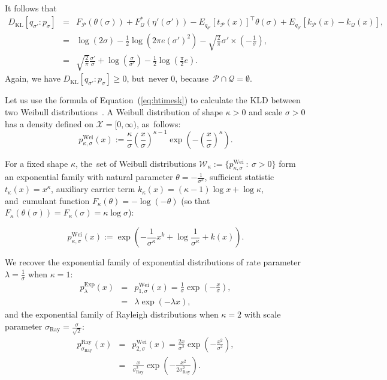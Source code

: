 \documentclass[entropy,article,accept,oneauthor,pdftex,entropy]{Definitions/mdpi}
\def\calW{\mathcal{W}}
\def\Ray{\mathrm{Ray}}
\def\Exp{\mathrm{Exp}}
\def\calQ{\mathcal{Q}}
\def\Wei{\mathrm{Wei}}
\def\KL{\mathrm{KL}}
\def\calQ{\mathcal{Q}}
\def\calP{\mathcal{P}}
\def\calX{\mathcal{X}}
\begin{document}
\begin{paracol}{2}
\begin{Example}
It follows that
\begingroup\makeatletter\def\f@size{9}\check@mathfonts
\def\maketag@@@#1{\hbox{\m@th\normalsize\normalfont#1}}%
\begin{eqnarray}
D_\KL[q_{\sigma'}:p_{\sigma}] &=& 
F_\calP(\theta(\sigma))+F_\calQ^*(\eta'(\sigma'))-E_{q_{\theta'}}[t_\calP(x)]^\top\theta(\sigma) +E_{q_{\theta'}}[k_\calP(x)-k_\calQ(x)],\\
&=& \log (2\sigma)-\frac{1}{2}\log(2\pi e(\sigma')^2)-\sqrt{\frac{2}{\pi}}\sigma'\times\left(-\frac{1}{\sigma}\right),\\
&=& \sqrt{\frac{2}{\pi}}\frac{\sigma'}{\sigma}+\log\left(\frac{\sigma}{\sigma'}\right)-\frac{1}{2}\log(\frac{\pi}{2}e).
\end{eqnarray}
\endgroup
Again, we have $D_\KL[q_{\sigma'}:p_{\sigma}]\geq 0$, but~never $0$, because~$\calP\cap\calQ=\emptyset$.
\end{Example}


\begin{Example}\label{ex:Weibull}
Let us use the formula of Equation~(\ref{eq:htimesk}) to  calculate the KLD between two Weibull distributions~\cite{KLDWeibull-2013}.
A Weibull distribution of shape $\kappa>0$ and  scale  $\sigma>0$ has a density defined on $\calX=[0,\infty)$, as~follows:
$$
p^\Wei_{\kappa,\sigma}(x) := \frac{\kappa}{\sigma} \left(\frac{x}{\sigma}\right)^{\kappa-1} 
\exp\left(-\left(\frac{x}{\sigma}\right)^\kappa\right).
$$

For a fixed shape $\kappa$, the~set of Weibull distributions $\calW_\kappa:=\{p^\Wei_{\kappa,\sigma}\ :\ \sigma>0\}$ form an exponential family with natural parameter $\theta=-\frac{1}{\sigma^\kappa}$, sufficient statistic $t_\kappa(x)=x^\kappa$, 
auxiliary carrier term $k_\kappa(x)=(\kappa-1)\log x+\log \kappa$, and~cumulant function $F_\kappa(\theta)=-\log(-\theta)$ (so that 
$F_\kappa(\theta(\sigma))=F_\kappa(\sigma)=\kappa\log\sigma$):

$$
p^\Wei_{\kappa,\sigma}(x):=\exp\left(-\frac{1}{\sigma^\kappa} x^k +\log\frac{1}{\sigma^\kappa}+k(x)\right).
$$

We recover the exponential family of exponential distributions of rate parameter $\lambda=\frac{1}{\sigma}$ when $\kappa=1$:
\begin{eqnarray*}
p^\Exp_\lambda(x)&=&p^\Wei_{1,\sigma}(x)=\frac{1}{\sigma}\exp\left(-\frac{x}{\sigma}\right),\\
&=& \lambda\exp\left(-\lambda x\right),
\end{eqnarray*}
 and the exponential family of Rayleigh distributions when $\kappa=2$ with scale parameter $\sigma_\Ray=\frac{\sigma}{\sqrt{2}}$:
\begin{eqnarray*}
p^\Ray_{\sigma_\Ray}(x)&=&p^\Wei_{2,\sigma}(x)=\frac{2x}{\sigma^2}\exp\left(-\frac{x^2}{\sigma^2}\right),\\
&=&\frac{x}{\sigma_\Ray^2}\exp\left(-\frac{x^2}{2\sigma_\Ray^2}\right).
\end{eqnarray*}


\end{Example}
\end{paracol}
\end{document}
